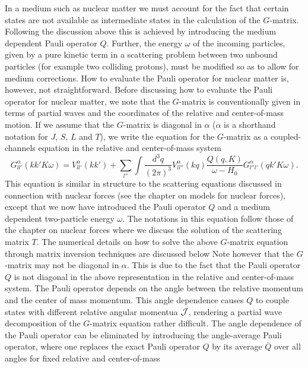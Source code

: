 \documentclass[%
oneside,                 %
final,                   %
10pt]{article}
\begin{document}
In a medium such as nuclear 
matter we must account
for the fact that certain states are not available as intermediate
states in the calculation of the $G$-matrix.
Following the discussion above
this is achieved by introducing the medium
dependent Pauli operator $Q$. Further, the
energy $\omega$ of the incoming particles, given by a pure kinetic
term in a scattering problem between two unbound particles (for example two colliding protons), must be modified so as to allow
for medium corrections.
How to evaluate the Pauli operator for
nuclear matter is, however, not straightforward.
Before discussing how to evaluate the Pauli operator for nuclear matter,
we note that the $G$-matrix
is conventionally given in terms of partial waves and
the coordinates of the relative and center-of-mass motion.
If we assume that the $G$-matrix is diagonal in $\alpha$ ($\alpha$ is a shorthand
notation for $J$, $S$, $L$ and $T$), we  write the equation for the $G$-matrix as a 
coupled-channels equation in the relative and center-of-mass system
\begin{equation}
   G_{ll'}^{\alpha}(kk'K\omega )=V_{ll'}^{\alpha}(kk')
   +\sum_{l''}\int \frac{d^3 q}{(2\pi )^3}V_{ll''}^{\alpha}(kq)
   \frac{Q(q,K)}{\omega -H_0}
   G_{l''l'}^{\alpha}(qk'K\omega).
   \label{eq:gnonrel}
\end{equation}
This equation is similar in structure to the scattering
equations discussed in connection with nuclear forces (see the chapter on models for nuclear forces), except that we now have
introduced the Pauli operator $Q$ and a medium dependent two-particle
energy $\omega$. The notations in this equation follow those of the chapter on nuclear forces
where we discuss the solution of the scattering
matrix $T$.
The numerical details on how to solve the above $G$-matrix
equation through matrix inversion techniques are discussed below
Note however that the $G$-matrix may not be diagonal in $\alpha$.
This is due to the fact that the
Pauli operator $Q$ is not diagonal
in the above representation in the relative and center-of-mass
system. The Pauli operator depends on the
angle between the relative momentum and the center of mass momentum.
This angle dependence causes $Q$ to couple states with different
relative angular
momentua ${\cal J}$, rendering  a partial wave decomposition of the $G$-matrix equation 
rather difficult.
The angle dependence of the Pauli operator
can be eliminated by introducing the angle-average
Pauli operator, where one replaces the exact Pauli operator $Q$
by its average $\bar{Q}$ over all angles for fixed relative and center-of-mass
\end{document}
